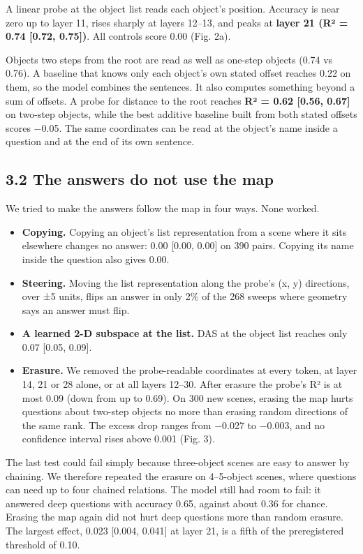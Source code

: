 \documentclass[
  11pt,
]{article}
\providecommand{\tightlist}{%
  \setlength{\itemsep}{0pt}\setlength{\parskip}{0pt}}
\begin{document}
A linear probe at the object list reads each object's position. Accuracy
is near zero up to layer 11, rises sharply at layers 12--13, and peaks
at \textbf{layer 21 (R² = 0.74 {[}0.72, 0.75{]})}. All controls score
0.00 (Fig. 2a).

Objects two steps from the root are read as well as one-step objects
(0.74 vs 0.76). A baseline that knows only each object's own stated
offset reaches 0.22 on them, so the model combines the sentences. It
also computes something beyond a sum of offsets. A probe for distance to
the root reaches \textbf{R² = 0.62 {[}0.56, 0.67{]}} on two-step
objects, while the best additive baseline built from both stated offsets
scores −0.05. The same coordinates can be read at the object's name
inside a question and at the end of its own sentence.

\subsection{3.2 The answers do not use the
map}\label{the-answers-do-not-use-the-map}

We tried to make the answers follow the map in four ways. None worked.

\begin{itemize}
\tightlist
\item
  \textbf{Copying.} Copying an object's list representation from a scene
  where it sits elsewhere changes no answer: 0.00 {[}0.00, 0.00{]} on
  390 pairs. Copying its name inside the question also gives 0.00.
\item
  \textbf{Steering.} Moving the list representation along the probe's
  (x, y) directions, over ±5 units, flips an answer in only 2\% of the
  268 sweeps where geometry says an answer must flip.
\item
  \textbf{A learned 2-D subspace at the list.} DAS at the object list
  reaches only 0.07 {[}0.05, 0.09{]}.
\item
  \textbf{Erasure.} We removed the probe-readable coordinates at every
  token, at layer 14, 21 or 28 alone, or at all layers 12--30. After
  erasure the probe's R² is at most 0.09 (down from up to 0.69). On 300
  new scenes, erasing the map hurts questions about two-step objects no
  more than erasing random directions of the same rank. The excess drop
  ranges from −0.027 to −0.003, and no confidence interval rises above
  0.001 (Fig. 3).
\end{itemize}

The last test could fail simply because three-object scenes are easy to
answer by chaining. We therefore repeated the erasure on 4--5-object
scenes, where questions can need up to four chained relations. The model
still had room to fail: it answered deep questions with accuracy 0.65,
against about 0.36 for chance. Erasing the map again did not hurt deep
questions more than random erasure. The largest effect, 0.023 {[}0.004,
0.041{]} at layer 21, is a fifth of the preregistered threshold of 0.10.
\end{document}
